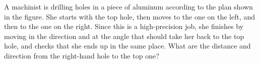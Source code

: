  A machinist is drilling holes in a piece of aluminum
according to the plan shown in the figure. She starts with
the top hole, then moves to the one on the left, and then to
the one on the right. Since this is a high-precision job,
she finishes by moving in the direction and at the angle
that should take her back to the top hole, and checks that
she ends up in the same place. What are the distance and
direction from the right-hand hole to the top one?\answercheck\hwendpart
